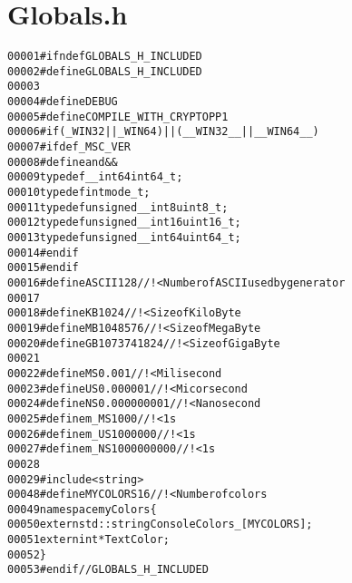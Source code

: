 \hypertarget{Globals_8h_source}{
\section{Globals.h}
}


\begin{footnotesize}\begin{alltt}
00001 \textcolor{preprocessor}{#ifndef GLOBALS\_H\_INCLUDED}
00002 \textcolor{preprocessor}{}\textcolor{preprocessor}{#define GLOBALS\_H\_INCLUDED}
00003 \textcolor{preprocessor}{}
00004 \textcolor{preprocessor}{    #define DEBUG}
00005 \textcolor{preprocessor}{}\textcolor{preprocessor}{    #define COMPILE\_WITH\_CRYPTOPP 1}
00006 \textcolor{preprocessor}{}\textcolor{preprocessor}{    #if ( \_WIN32 || \_WIN64 ) || ( \_\_WIN32\_\_ || \_\_WIN64\_\_ )}
00007 \textcolor{preprocessor}{}\textcolor{preprocessor}{        #ifdef \_MSC\_VER}
00008 \textcolor{preprocessor}{}\textcolor{preprocessor}{            #define and &&}
00009 \textcolor{preprocessor}{}            \textcolor{keyword}{typedef} \_\_int64 int64\_t;
00010             \textcolor{keyword}{typedef} \textcolor{keywordtype}{int} mode\_t;
00011             \textcolor{keyword}{typedef} \textcolor{keywordtype}{unsigned} \_\_int8 uint8\_t;
00012             \textcolor{keyword}{typedef} \textcolor{keywordtype}{unsigned} \_\_int16 uint16\_t;
00013             \textcolor{keyword}{typedef} \textcolor{keywordtype}{unsigned} \_\_int64 uint64\_t;
00014 \textcolor{preprocessor}{        #endif}
00015 \textcolor{preprocessor}{}\textcolor{preprocessor}{    #endif}
00016 \textcolor{preprocessor}{}\textcolor{preprocessor}{    #define ASCII 128 //!< Number of ASCII used by generator}
00017 \textcolor{preprocessor}{}
00018 \textcolor{preprocessor}{    #define KB 1024 //!<Size of KiloByte}
00019 \textcolor{preprocessor}{}\textcolor{preprocessor}{    #define MB 1048576 //!<Size of MegaByte}
00020 \textcolor{preprocessor}{}\textcolor{preprocessor}{    #define GB 1073741824 //!<Size of GigaByte}
00021 \textcolor{preprocessor}{}
00022 \textcolor{preprocessor}{    #define MS 0.001 //!< Milisecond}
00023 \textcolor{preprocessor}{}\textcolor{preprocessor}{    #define US 0.000001 //!< Micorsecond}
00024 \textcolor{preprocessor}{}\textcolor{preprocessor}{    #define NS 0.000000001 //!< Nanosecond}
00025 \textcolor{preprocessor}{}\textcolor{preprocessor}{    #define m\_MS 1000 //!< 1s}
00026 \textcolor{preprocessor}{}\textcolor{preprocessor}{    #define m\_US 1000000 //!< 1s}
00027 \textcolor{preprocessor}{}\textcolor{preprocessor}{    #define m\_NS 1000000000 //!< 1s}
00028 \textcolor{preprocessor}{}
00029 \textcolor{preprocessor}{    #include <string>}
00048 \textcolor{preprocessor}{    #define MYCOLORS 16 //!< Number of colors}
00049 \textcolor{preprocessor}{}\textcolor{keyword}{namespace }myColors\{
00050     \textcolor{keyword}{extern} std::string ConsoleColors\_[MYCOLORS]; 
00051     \textcolor{keyword}{extern} \textcolor{keywordtype}{int} *TextColor; 
00052 \}
00053 \textcolor{preprocessor}{#endif // GLOBALS\_H\_INCLUDED}
\end{alltt}\end{footnotesize}
